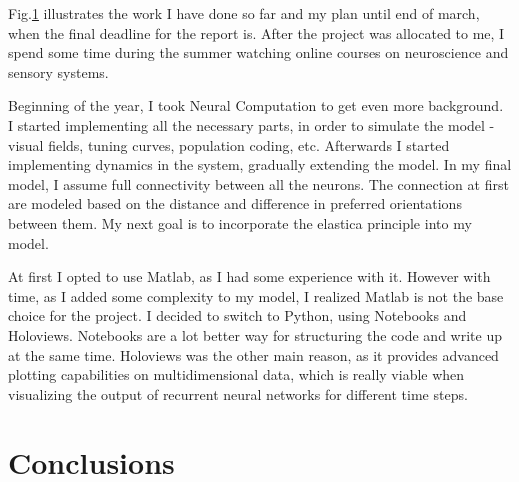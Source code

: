 \begin{figure}
\label{timeline}
\end{figure}

Fig.\ref{timeline} illustrates the work I have done so far and my plan until end of march, when the final deadline for the report is. After the project was allocated to me, I spend some time during the summer watching online courses on neuroscience and sensory systems.

Beginning of the year, I took Neural Computation to get even more background. I started implementing all the necessary parts, in order to simulate the model - visual fields, tuning curves, population coding, etc. Afterwards I started implementing dynamics in the system, gradually extending the model. In my final model, I assume full connectivity between all the neurons. The connection at first are modeled based on the distance and difference in preferred orientations between them. My next goal is to incorporate the elastica principle into my model. 

At first I opted to use Matlab, as I had some experience with it. However with time, as I added some complexity to my model, I realized Matlab is not the base choice for the project. I decided to switch to Python, using Notebooks and Holoviews. Notebooks are a lot better way for structuring the code and write up at the same time. Holoviews was the other main reason, as it provides advanced plotting capabilities on multidimensional data, which is really viable when visualizing the output of recurrent neural networks for different time steps.


\chapter{Conclusions}






